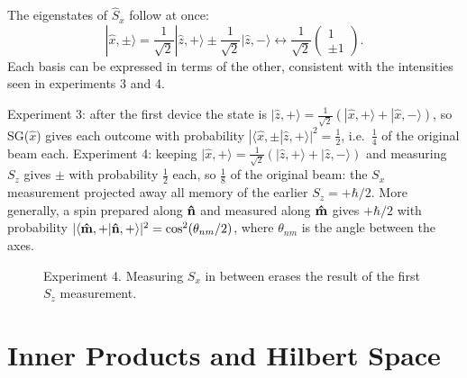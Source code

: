 The eigenstates of $\hat{S}_x$ follow at once:
\[
    |\hat{x},\pm\rangle = \frac{1}{\sqrt2}|\hat{z},+\rangle \pm \frac{1}{\sqrt2}|\hat{z},-\rangle
    \leftrightarrow\frac{1}{\sqrt2}\begin{pmatrix}1\\\pm1\end{pmatrix}.
\]
Each basis can be expressed in terms of the other, consistent with the intensities seen in experiments 3 and 4.

\begin{example}
Experiment 3: after the first device the state is $|\hat{z},+\rangle = \frac{1}{\sqrt2}(|\hat{x},+\rangle + |\hat{x},-\rangle)$, so SG($\hat{x}$) gives each outcome with probability $|\langle\hat{x},\pm|\hat{z},+\rangle|^2 = \frac12$, i.e.\ $\frac14$ of the original beam each. Experiment 4: keeping $|\hat{x},+\rangle = \frac{1}{\sqrt2}(|\hat{z},+\rangle + |\hat{z},-\rangle)$ and measuring $S_z$ gives $\pm$ with probability $\frac12$ each, so $\frac18$ of the original beam: the $S_x$ measurement projected away all memory of the earlier $S_z = +\hbar/2$. More generally, a spin prepared along $\boldsymbol{\hat{\textbf{n}}}$ and measured along $\boldsymbol{\hat{\textbf{m}}}$ gives $+\hbar/2$ with probability $|\langle\boldsymbol{\hat{\textbf{m}}},+|\boldsymbol{\hat{\textbf{n}}},+\rangle|^2 = \cos^2(\theta_{nm}/2)$, where $\theta_{nm}$ is the angle between the axes.
\end{example}

\begin{figure}[ht]
\centering
{}
\caption{Experiment 4. Measuring $S_x$ in between erases the result of the first $S_z$ measurement.}
\end{figure}

\section{Inner Products and Hilbert Space}

